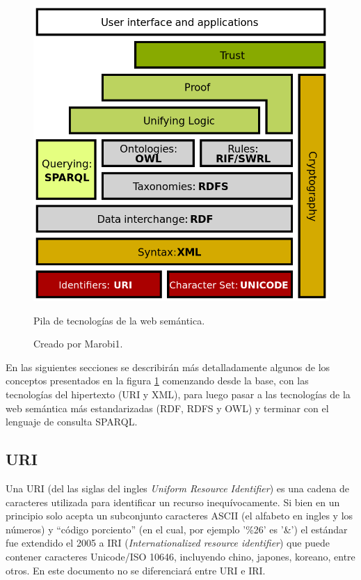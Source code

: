 \begin{figure}[htpb]
  \centering
  \includegraphics[width=.6\textwidth]{figures/Semantic_web_stack.png}
  \caption{Pila de tecnologías de la web semántica.}
  \vspace{-.25cm}
  \caption*{Creado por Marobi1\cite{wikimg:swstack}.}
  \label{fig:swstack}
\end{figure}

En las siguientes secciones se describirán más detalladamente algunos de los
conceptos presentados en la figura \ref{fig:swstack} comenzando desde la base,
con las tecnologías del hipertexto (URI y XML), para luego pasar a las
tecnologías de la web semántica más estandarizadas (RDF, RDFS y OWL) y terminar
con el lenguaje de consulta SPARQL.

\subsection{URI}
Una URI (del las siglas del ingles \emph{Uniform Resource Identifier}) es una
cadena de caracteres utilizada para identificar un recurso inequívocamente.
Si bien en un principio solo acepta un subconjunto caracteres ASCII (el alfabeto
en ingles y los números) y ``código porciento'' (en el cual, por ejemplo '\%26'
es '\&') el estándar fue extendido el 2005 a IRI (\emph{Internationalized
resource identifier}) que puede contener caracteres Unicode/ISO 10646,
incluyendo chino, japones, koreano, entre otros\cite{gangemi2006bourne}.
En este documento no se diferenciará entre URI e IRI.

